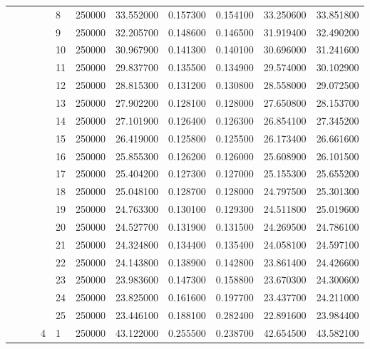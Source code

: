 \begin{tabular}{llllllrrrrr}
\cline{5-11}
 &  &  &  & 8 & 250000 & 33.552000 & 0.157300 & 0.154100 & 33.250600 & 33.851800 \\
\cline{5-11}
 &  &  &  & 9 & 250000 & 32.205700 & 0.148600 & 0.146500 & 31.919400 & 32.490200 \\
\cline{5-11}
 &  &  &  & 10 & 250000 & 30.967900 & 0.141300 & 0.140100 & 30.696000 & 31.241600 \\
\cline{5-11}
 &  &  &  & 11 & 250000 & 29.837700 & 0.135500 & 0.134900 & 29.574000 & 30.102900 \\
\cline{5-11}
 &  &  &  & 12 & 250000 & 28.815300 & 0.131200 & 0.130800 & 28.558000 & 29.072500 \\
\cline{5-11}
 &  &  &  & 13 & 250000 & 27.902200 & 0.128100 & 0.128000 & 27.650800 & 28.153700 \\
\cline{5-11}
 &  &  &  & 14 & 250000 & 27.101900 & 0.126400 & 0.126300 & 26.854100 & 27.345200 \\
\cline{5-11}
 &  &  &  & 15 & 250000 & 26.419000 & 0.125800 & 0.125500 & 26.173400 & 26.661600 \\
\cline{5-11}
 &  &  &  & 16 & 250000 & 25.855300 & 0.126200 & 0.126000 & 25.608900 & 26.101500 \\
\cline{5-11}
 &  &  &  & 17 & 250000 & 25.404200 & 0.127300 & 0.127000 & 25.155300 & 25.655200 \\
\cline{5-11}
 &  &  &  & 18 & 250000 & 25.048100 & 0.128700 & 0.128000 & 24.797500 & 25.301300 \\
\cline{5-11}
 &  &  &  & 19 & 250000 & 24.763300 & 0.130100 & 0.129300 & 24.511800 & 25.019600 \\
\cline{5-11}
 &  &  &  & 20 & 250000 & 24.527700 & 0.131900 & 0.131500 & 24.269500 & 24.786100 \\
\cline{5-11}
 &  &  &  & 21 & 250000 & 24.324800 & 0.134400 & 0.135400 & 24.058100 & 24.597100 \\
\cline{5-11}
 &  &  &  & 22 & 250000 & 24.143800 & 0.138900 & 0.142800 & 23.861400 & 24.426600 \\
\cline{5-11}
 &  &  &  & 23 & 250000 & 23.983600 & 0.147300 & 0.158800 & 23.670300 & 24.300600 \\
\cline{5-11}
 &  &  &  & 24 & 250000 & 23.825000 & 0.161600 & 0.197700 & 23.437700 & 24.211000 \\
\cline{5-11}
 &  &  &  & 25 & 250000 & 23.446100 & 0.188100 & 0.282400 & 22.891600 & 23.984400 \\
\cline{4-11} \cline{5-11}
 &  &  & \multirow[t]{25}{*}{4} & 1 & 250000 & 43.122000 & 0.255500 & 0.238700 & 42.654500 & 43.582100 \\

\end{tabular}
